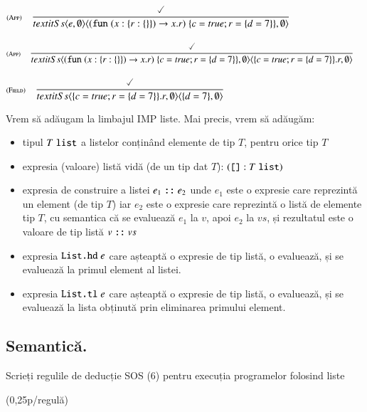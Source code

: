 \documentclass[addpoints,12pt,a4paper,answers]{exam}
\newcommand{\getHeight}[1]{%
#1%
}
\newenvironment{solutie}{\par\hspace*{-9em}\begin{minipage}{.98\paperwidth}
\hrulefill {\bf Rezolvare} \hrulefill}{\hrulefill\end{minipage}}
\begin{document}
\begin{questions}
\begin{parts}
\begin{solutie}
\(\displaystyle
\reg[App]{
\\textit{Ss}{\c{e,\emptyset}}
   {\c{(\Sfun (x:\{r:\{\}\}) \rightarrow  x.r) \; \{c={\Strue}; r=\{d=7\}\},\emptyset}}
   }{\done}{}
\)\\\\
\(\displaystyle
\reg[App]{
\\textit{Ss}{{\c{(\Sfun (x:\{r:\{\}\}) \rightarrow  x.r) \; \{c={\Strue}; r=\{d=7\}\},\emptyset}}}
   {{\c{\{c={\Strue}; r=\{d=7\}\}.r,\emptyset}}}
}{\done}{}
\)\\\\
\(\displaystyle
\reg[Field]{
\\textit{Ss}{{\c{\{c={\Strue}; r=\{d=7\}\}.r,\emptyset}}}
   {{\c{\{d=7\},\emptyset}}}
}{\done}{}
\)

\end{solutie}

\end{parts}
{}
Vrem să adăugam la limbajul IMP liste.  Mai precis, vrem să adăugăm:
\begin{itemize}
\item tipul $T \mathrel{\text{\ttfamily list}}$ a listelor conținând elemente de tip $T$, pentru orice tip $T$
\item expresia (valoare) listă vidă (de un tip dat $T$): $({\mathrel{\text{\ttfamily []}}} : T \mathrel{\text{\ttfamily list}})$
\item expresia de construire a listei $e_1 \mathrel{\text{\ttfamily ::}} e_2$ unde $e_1$ este o expresie care reprezintă un element (de tip $T$) iar $e_2$ este o expresie care reprezintă o listă de elemente tip $T$, cu semantica că se evaluează $e_1$ la $v$, apoi $e_2$ la $vs$, și rezultatul este o valoare de tip listă $v \mathrel{\text{\ttfamily ::}} vs$
\item expresia $\mathrel{\text{\ttfamily List.hd}} e$ care așteaptă o expresie de tip listă, o evaluează, și se evaluează la primul element al listei.
\item expresia $\mathrel{\text{\ttfamily List.tl}} e$ care așteaptă o expresie de tip listă, o evaluează, și se evaluează la lista obținută prin eliminarea primului element.
\end{itemize}
\begin{parts}
\part[1\half] {\bf Semantică. } Scrieți regulile de deducție SOS (6) pentru execuția programelor folosind liste 
\begin{solutie}
(0,25p/regulă)


\end{solutie}
\end{parts}
\end{questions}
\end{document}
